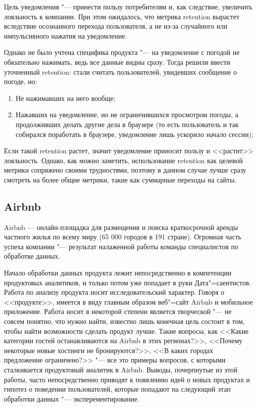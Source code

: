 \documentclass[referat, times]{SCWorks}
\begin{document}
Цель уведомления "--- принести пользу потребителям и, как следствие, увеличить лояльность к компании. При этом ожидалось, что метрика retention вырастет вследствие осознанного перехода пользователя, а не из-за случайного или импульсивного нажатия на уведомление.

Однако не было учтена специфика продукта "--- на уведомление с погодой не обязательно нажимать, ведь все данные видны сразу. Тогда решили ввести уточненный retention: стали считать пользователей, увидевших сообщение о погоде, но:

\begin{enumerate}
    \item Не нажимавших на него вообще;
    \item Нажавших на уведомление, но не ограничившихся просмотром погоды, а продолживших делать другие дела в браузере 
    (то есть пользователь и так собирался поработать в браузере, уведомление лишь ускорило начало сессии);
\end{enumerate}

Если такой retention растет, значит уведомление приносит пользу и <<растит>> лояльность. Однако, как можно заметить, использование retention как целевой метрики сопряжено своими трудностями, поэтому в данном случае лучше сразу смотреть на более общие метрики, такие как суммарные переходы на сайты\cite{yandexWeather}.

\subsection{Airbnb}
Airbnb — онлайн-площадка для размещения и поиска краткосрочной аренды частного жилья по всему миру (65 000 городов в 191 стране). Огромная часть успеха компании "--- результат налаженной работы команды специалистов по обработке данных.

Начало обработки данных продукта лежит непосредственно в компетенции продуктовых аналитиков, и только потом уже попадает в руки Дата"=саентистов.
Работа по анализу продукта носит исследовательский характер. Говоря о <<продукте>>, имеется в виду главным образом веб"=сайт Airbnb и мобильное приложение. Работа носит в некоторой степени является творческой "--- не совсем понятно, что нужно найти, известно лишь конечная цель состоит в том, чтобы найти возможности сделать продукт лучше. Такие вопросы, как <<Какие категории гостей останавливаются на Airbnb в этих регионах?>>, <<Почему некоторые новые хостинги не бронируются?>>, <<В каких городах предложение ограничено?>> "--- все это примеры вопросов, с которыми сталкивается продуктовый аналитик в Airbnb. Выводы, почерпнутые из этой работы, часто непосредственно приводят к появлению идей о новых продуктах и гипотез о поведении пользователей, которые попадают на следующий этап обработки данных "--- эксперементирование. 
\end{document}
